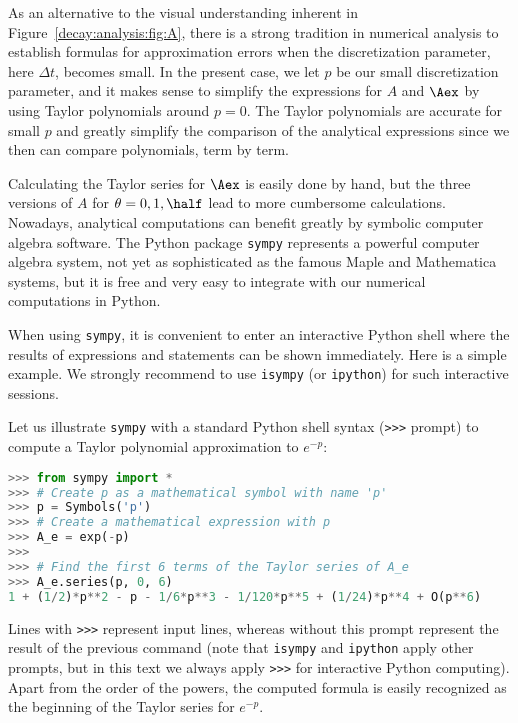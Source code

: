 \documentclass[graybox,sectrefs,envcountresetchap,open=right,final]{svmonodo}
\begin{document}
As an alternative to the visual understanding inherent in Figure~\ref{decay:analysis:fig:A}, there is a strong tradition in numerical
analysis to establish formulas for approximation errors when the
discretization parameter, here $\Delta t$, becomes small. In the
present case, we let $p$ be our small discretization parameter, and it
makes sense to simplify the expressions for $A$ and $\Aex$ by using
Taylor polynomials around $p=0$.  The Taylor polynomials are accurate
for small $p$ and greatly simplify the comparison of the analytical
expressions since we then can compare polynomials, term by term.

Calculating the Taylor series for $\Aex$ is easily done by hand, but
the three versions of $A$ for $\theta=0,1,{\half}$ lead to more
cumbersome calculations.
Nowadays, analytical computations can benefit greatly by
symbolic computer algebra software. The Python package \texttt{sympy}
represents a powerful computer algebra system, not yet as sophisticated as
the famous Maple and Mathematica systems, but it is free and
very easy to integrate with our numerical computations in Python.


When using \texttt{sympy}, it is convenient to enter an interactive Python
shell where the results of expressions and statements can be shown
immediately.
Here is a simple example. We strongly recommend to use
\texttt{isympy} (or \texttt{ipython}) for such interactive sessions.

Let us illustrate \texttt{sympy} with a standard Python shell syntax
(\Verb!>>>! prompt) to compute a Taylor polynomial approximation to $e^{-p}$:

\begin{lstlisting}[language=Python,style=blue1_bluegreen]
>>> from sympy import *
>>> # Create p as a mathematical symbol with name 'p'
>>> p = Symbols('p')
>>> # Create a mathematical expression with p
>>> A_e = exp(-p)
>>>
>>> # Find the first 6 terms of the Taylor series of A_e
>>> A_e.series(p, 0, 6)
1 + (1/2)*p**2 - p - 1/6*p**3 - 1/120*p**5 + (1/24)*p**4 + O(p**6)
\end{lstlisting}
Lines with \Verb!>>>! represent input lines, whereas without
this prompt represent the result of the previous command (note that
\texttt{isympy} and \texttt{ipython} apply other prompts, but in this text
we always apply \Verb!>>>! for interactive Python computing).
Apart from the order of the powers, the computed formula is easily
recognized as the beginning of the Taylor series for $e^{-p}$.
\end{document}
